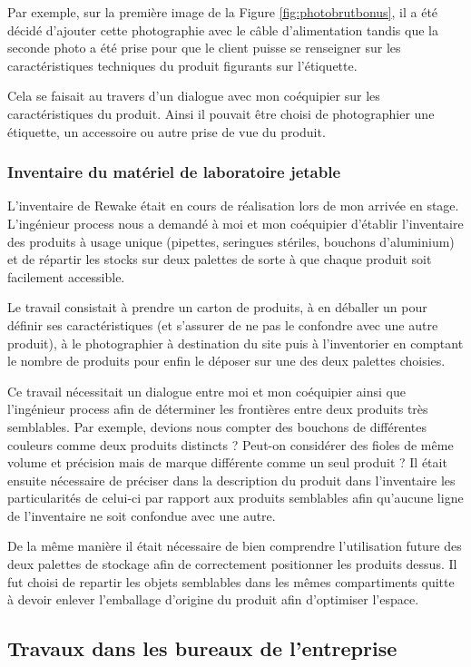 \documentclass{rapportENSCP}
\begin{document}
Par exemple, sur la première image de la Figure \ref{fig:photobrutbonus}, il a été décidé d'ajouter cette photographie avec le câble d'alimentation tandis que la seconde photo a été prise pour que le client puisse se renseigner sur les caractéristiques techniques du produit figurants sur l'étiquette.

Cela se faisait au travers d’un dialogue avec mon coéquipier sur les caractéristiques du produit. Ainsi il pouvait être choisi de photographier une étiquette, un accessoire ou  autre prise de vue du produit.


\subsubsection{Inventaire du matériel de laboratoire jetable}
L’inventaire de Rewake était en cours de réalisation lors de mon arrivée en stage. L’ingénieur process nous a demandé à moi et mon coéquipier d’établir l’inventaire des produits à usage unique (pipettes, seringues stériles, bouchons d’aluminium) et de répartir les stocks sur deux palettes de sorte à que chaque produit soit facilement accessible. 

Le travail consistait à prendre un carton de produits, à en déballer un pour définir ses caractéristiques (et s’assurer de ne pas le confondre avec une autre produit), à le photographier à destination du site puis à l’inventorier en comptant le nombre de produits pour enfin le déposer sur une des deux palettes choisies.

Ce travail nécessitait un dialogue entre moi et mon coéquipier ainsi que l’ingénieur process afin de déterminer les frontières entre deux produits très semblables. Par exemple, devions nous compter des bouchons de différentes couleurs comme deux produits distincts ? Peut-on considérer des fioles de même volume et précision mais de marque différente comme un seul produit ? Il était ensuite nécessaire de préciser dans la description du produit dans l’inventaire les particularités de celui-ci par rapport aux produits semblables afin qu’aucune ligne de l’inventaire ne soit confondue avec une autre.

De la même manière il était nécessaire de bien comprendre l’utilisation future des deux palettes de stockage afin de correctement positionner les produits dessus. Il fut choisi de repartir les objets semblables dans les mêmes compartiments quitte à devoir enlever l’emballage d’origine du produit afin d’optimiser l’espace.

\subsection{Travaux dans les bureaux de l'entreprise}
\end{document}

